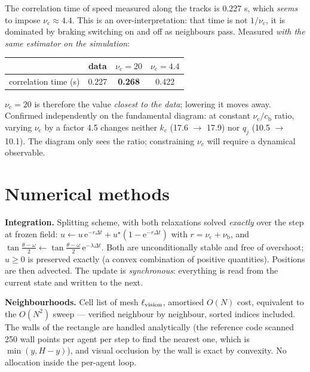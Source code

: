 \documentclass[11pt,a4paper]{article}
\newcommand{\cruise}{\mathrm{c}}
\newcommand{\brake}{\mathrm{b}}
\begin{document}
The correlation time of speed measured along the tracks is 0.227 s, which
\emph{seems} to impose $\nu_\cruise\approx4.4$. This is an over-interpretation:
that time is not $1/\nu_\cruise$, it is dominated by braking switching on and
off as neighbours pass. Measured \emph{with the same estimator on the
simulation}:

\begin{center}
\begin{tabular}{@{}lccc@{}}
\toprule
 & data & $\nu_\cruise=20$ & $\nu_\cruise=4.4$ \\
\midrule
correlation time (s) & 0.227 & \textbf{0.268} & 0.422 \\
\bottomrule
\end{tabular}
\end{center}

$\nu_\cruise = 20$ is therefore the value \emph{closest to the data}; lowering
it moves away. Confirmed independently on the fundamental diagram: at constant
$\nu_\cruise/c_\brake$ ratio, varying $\nu_\cruise$ by a factor 4.5 changes
neither $k_c$ (17.6 $\to$ 17.9) nor $q_j$ (10.5 $\to$ 10.1). The diagram only
sees the ratio; constraining $\nu_\cruise$ will require a dynamical observable.

\section{Numerical methods}

\textbf{Integration.} Splitting scheme, with both relaxations solved
\emph{exactly} over the step at frozen field:
$u \leftarrow u\,\mathrm e^{-r\Delta t} + u^\star(1-\mathrm e^{-r\Delta t})$
with $r=\nu_\cruise+\nu_\brake$, and
$\tan\frac{\theta-\omega}{2}\leftarrow\tan\frac{\theta-\omega}{2}\,\mathrm e^{-\lambda\Delta t}$.
Both are unconditionally stable and free of overshoot; $u\geq0$ is preserved
exactly (a convex combination of positive quantities). Positions are then
advected. The update is \emph{synchronous}: everything is read from the current
state and written to the next.

\textbf{Neighbourhoods.} Cell list of mesh $\ell_{\rm vision}$, amortised
$O(N)$ cost, equivalent to the $O(N^2)$ sweep --- verified neighbour by
neighbour, sorted indices included. The walls of the rectangle are handled
analytically (the reference code scanned 250 wall points per agent per step to
find the nearest one, which is $\min(y, H-y)$), and visual occlusion by the wall
is exact by convexity. No allocation inside the per-agent loop.
\end{document}
